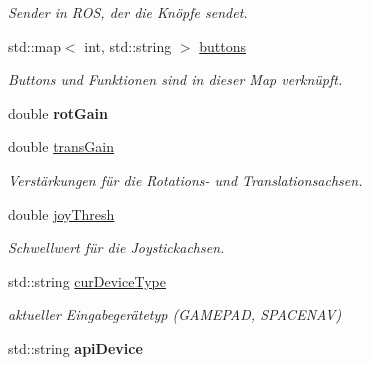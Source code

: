 \begin{DoxyCompactItemize}
\begin{DoxyCompactList}\small\item\em Sender in R\-O\-S, der die Knöpfe sendet. \end{DoxyCompactList}\item 
\hypertarget{classControlDevice_ae08a1b61bf2c58f3248ddbd0e57904c9}{std\-::map$<$ int, std\-::string $>$ \hyperlink{classControlDevice_ae08a1b61bf2c58f3248ddbd0e57904c9}{buttons}}\label{classControlDevice_ae08a1b61bf2c58f3248ddbd0e57904c9}

\begin{DoxyCompactList}\small\item\em Buttons und Funktionen sind in dieser Map verknüpft. \end{DoxyCompactList}\item 
\hypertarget{classControlDevice_aee18bd1109d4220e3ede5a47bdc3aa5a}{double {\bfseries rot\-Gain}}\label{classControlDevice_aee18bd1109d4220e3ede5a47bdc3aa5a}

\item 
\hypertarget{classControlDevice_a51812d84ab5cce6233d296fc8e0d000e}{double \hyperlink{classControlDevice_a51812d84ab5cce6233d296fc8e0d000e}{trans\-Gain}}\label{classControlDevice_a51812d84ab5cce6233d296fc8e0d000e}

\begin{DoxyCompactList}\small\item\em Verstärkungen für die Rotations-\/ und Translationsachsen. \end{DoxyCompactList}\item 
\hypertarget{classControlDevice_a10e97555607f3140b31b14458dc23352}{double \hyperlink{classControlDevice_a10e97555607f3140b31b14458dc23352}{joy\-Thresh}}\label{classControlDevice_a10e97555607f3140b31b14458dc23352}

\begin{DoxyCompactList}\small\item\em Schwellwert für die Joystickachsen. \end{DoxyCompactList}\item 
\hypertarget{classControlDevice_af353f21c18ff47eb33f9331e8b7263c5}{std\-::string \hyperlink{classControlDevice_af353f21c18ff47eb33f9331e8b7263c5}{cur\-Device\-Type}}\label{classControlDevice_af353f21c18ff47eb33f9331e8b7263c5}

\begin{DoxyCompactList}\small\item\em aktueller Eingabegerätetyp (G\-A\-M\-E\-P\-A\-D, S\-P\-A\-C\-E\-N\-A\-V) \end{DoxyCompactList}\item 
\hypertarget{classControlDevice_aaf8698d8be6563f2d0833a42375e8aed}{std\-::string {\bfseries api\-Device}}\label{classControlDevice_aaf8698d8be6563f2d0833a42375e8aed}


\end{DoxyCompactItemize}
